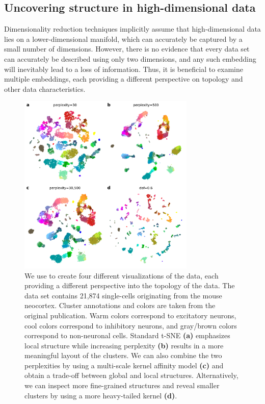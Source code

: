 \documentclass[article]{jss}
\newcommand{\opentsne}{\pkg{openTSNE}\xspace}
\begin{document}
\subsection{Uncovering structure in high-dimensional data}

Dimensionality reduction techniques implicitly assume that high-dimensional data lies on a lower-dimensional manifold, which can accurately be captured by a small number of dimensions. However, there is no evidence that every data set can accurately be described using only two dimensions, and any such embedding will inevitably lead to a loss of information. Thus, it is beneficial to examine multiple embeddings, each providing a different perspective on topology and other data characteristics.

\begin{figure}[htbp]
  \center
  \includegraphics[width=0.75\textwidth]{tasic2018}
  \caption{\label{fig:tasic}
  We use \opentsne to create four different
  visualizations of the \citet{tasic2018shared} data,
  each providing a different perspective into the topology of the data.
  The data set contains 21,874 single-cells originating from the mouse
  neocortex. Cluster annotations and colors are taken from the original
  publication. Warm colors correspond to excitatory neurons, cool colors
  correspond to inhibitory neurons, and gray/brown colors correspond to
  non-neuronal cells. Standard t-SNE \textbf{(a)} emphasizes local
  structure while increasing perplexity \textbf{(b)} results in a more
  meaningful layout of the clusters. We can also combine the two
  perplexities by using a multi-scale kernel affinity model \textbf{(c)}
  and obtain a trade-off between global and local structures.
  Alternatively, we can inspect more fine-grained structures and reveal
  smaller clusters by using a more heavy-tailed kernel \textbf{(d)}.}
\end{figure}
\end{document}
